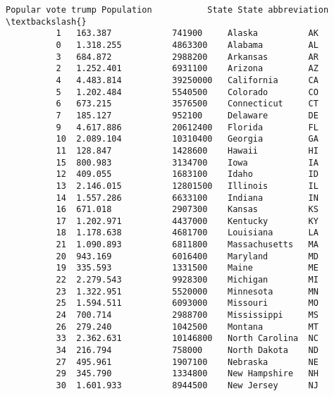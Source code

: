 \documentclass[11pt]{article}
\begin{document}
\begin{Verbatim}[commandchars=\\\{\}]
             Popular vote trump Population           State State abbreviation  \textbackslash{}
          1   163.387            741900     Alaska          AK                  
          0   1.318.255          4863300    Alabama         AL                  
          3   684.872            2988200    Arkansas        AR                  
          2   1.252.401          6931100    Arizona         AZ                  
          4   4.483.814          39250000   California      CA                  
          5   1.202.484          5540500    Colorado        CO                  
          6   673.215            3576500    Connecticut     CT                  
          7   185.127            952100     Delaware        DE                  
          9   4.617.886          20612400   Florida         FL                  
          10  2.089.104          10310400   Georgia         GA                  
          11  128.847            1428600    Hawaii          HI                  
          15  800.983            3134700    Iowa            IA                  
          12  409.055            1683100    Idaho           ID                  
          13  2.146.015          12801500   Illinois        IL                  
          14  1.557.286          6633100    Indiana         IN                  
          16  671.018            2907300    Kansas          KS                  
          17  1.202.971          4437000    Kentucky        KY                  
          18  1.178.638          4681700    Louisiana       LA                  
          21  1.090.893          6811800    Massachusetts   MA                  
          20  943.169            6016400    Maryland        MD                  
          19  335.593            1331500    Maine           ME                  
          22  2.279.543          9928300    Michigan        MI                  
          23  1.322.951          5520000    Minnesota       MN                  
          25  1.594.511          6093000    Missouri        MO                  
          24  700.714            2988700    Mississippi     MS                  
          26  279.240            1042500    Montana         MT                  
          33  2.362.631          10146800   North Carolina  NC                  
          34  216.794            758000     North Dakota    ND                  
          27  495.961            1907100    Nebraska        NE                  
          29  345.790            1334800    New Hampshire   NH                  
          30  1.601.933          8944500    New Jersey      NJ                  

\end{Verbatim}
\end{document}
